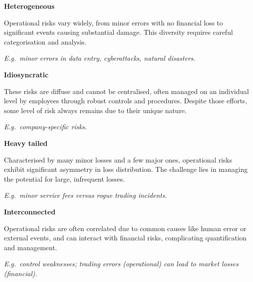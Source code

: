 

\begin{orkeybox}
{\sffamily\bfseries\fontsize{9.4}{11}\selectfont\color{navy}Heterogeneous}\par
\vspace{2pt}
Operational risks vary widely, from minor errors with no financial loss to
significant events causing substantial damage. This diversity requires careful
categorisation and analysis.\par
\vspace{3pt}
{\fontsize{9}{11}\selectfont\color{rust}\itshape E.g.\ minor errors in data
entry, cyberattacks, natural disasters.}
\end{orkeybox}

\begin{orkeybox}
{\sffamily\bfseries\fontsize{9.4}{11}\selectfont\color{navy}Idiosyncratic}\par
\vspace{2pt}
These risks are diffuse and cannot be centralised, often managed on an
individual level by employees through robust controls and procedures. Despite
those efforts, some level of risk always remains due to their unique nature.\par
\vspace{3pt}
{\fontsize{9}{11}\selectfont\color{rust}\itshape E.g.\ company-specific risks.}
\end{orkeybox}

\begin{orkeybox}
{\sffamily\bfseries\fontsize{9.4}{11}\selectfont\color{navy}Heavy tailed}\par
\vspace{2pt}
Characterised by many minor losses and a few major ones, operational risks
exhibit significant asymmetry in loss distribution. The challenge lies in
managing the potential for large, infrequent losses.\par
\vspace{3pt}
{\fontsize{9}{11}\selectfont\color{rust}\itshape E.g.\ minor service fees versus
rogue trading incidents.}
\end{orkeybox}

\begin{orkeybox}
{\sffamily\bfseries\fontsize{9.4}{11}\selectfont\color{navy}Interconnected}\par
\vspace{2pt}
Operational risks are often correlated due to common causes like human error or
external events, and can interact with financial risks, complicating
quantification and management.\par
\vspace{3pt}
{\fontsize{9}{11}\selectfont\color{rust}\itshape E.g.\ control weaknesses;
trading errors (operational) can lead to market losses (financial).}
\end{orkeybox}

